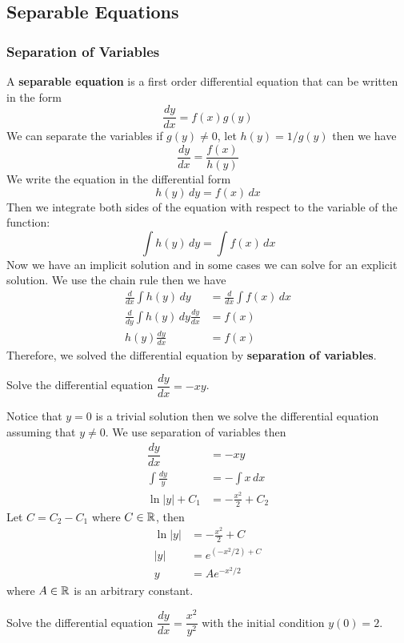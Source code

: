 \subsection{Separable Equations}
\subsubsection{Separation of Variables}
A \textbf{separable equation} is a first order differential equation that can
be written in the form
\[\frac{dy}{dx}=f(x)g(y)\]
We can separate the variables if \(g(y)\neq0\), let \(h(y)=1/g(y)\) then we
have
\[\frac{dy}{dx}=\frac{f(x)}{h(y)}\]
We write the equation in the differential form
\[h(y)\,dy=f(x)\,dx\]
Then we integrate both sides of the equation with respect to the variable of
the function:
\[\int h(y)\,dy=\int f(x)\,dx\]
Now we have an implicit solution and in some cases we can solve for an
explicit solution.
We use the chain rule then we have
\begin{align*}
    \frac{d}{dx}\int h(y)\,dy &= \frac{d}{dx}\int f(x)\,dx \\
    \frac{d}{dy}\int h(y)\,dy\frac{dy}{dx} &= f(x) \\
    h(y)\frac{dy}{dx} &= f(x)
\end{align*}
Therefore, we solved the differential equation by
\textbf{separation of variables}.
\begin{problem}
    Solve the differential equation \(\dfrac{dy}{dx}=-xy\).
\end{problem}
\begin{solution}
    Notice that \(y=0\) is a trivial solution then we solve the differential
    equation assuming that \(y\neq 0\).
    We use separation of variables then
    \begin{align*}
        \dfrac{dy}{dx} &= -xy \\
        \int\frac{dy}{y} &= -\int x\,dx \\
        \ln |y|+C_1 &= -\frac{x^2}{2}+C_2
    \end{align*}
    Let \(C=C_2-C_1\) where \(C\in\mathbb{R}\), then
    \begin{align*}
        \ln |y| &= -\frac{x^2}{2}+C \\
        |y| &= e^{(-x^2/2)+C} \\
        y &= Ae^{-x^2/2}
    \end{align*}
    where \(A\in\mathbb{R}\) is an arbitrary constant.
\end{solution}
\begin{problem}
    Solve the differential equation \(\dfrac{dy}{dx}=\dfrac{x^2}{y^2}\) with
    the initial condition \(y(0)=2\).
\end{problem}
